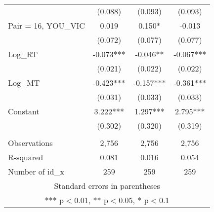 \documentclass[]{article}
\begin{document}
\begin{tabular}{lccc}
 & (0.088) & (0.093) & (0.093) \\
Pair = 16, YOU\_VIC & 0.019 & 0.150* & -0.013 \\
 & (0.072) & (0.077) & (0.077) \\
Log\_RT & -0.073*** & -0.046** & -0.067*** \\
 & (0.021) & (0.022) & (0.022) \\
Log\_MT & -0.423*** & -0.157*** & -0.361*** \\
 & (0.031) & (0.033) & (0.033) \\
Constant & 3.222*** & 1.297*** & 2.795*** \\
 & (0.302) & (0.320) & (0.319) \\
 &  &  &  \\
Observations & 2,756 & 2,756 & 2,756 \\
R-squared & 0.081 & 0.016 & 0.054 \\
 Number of id\_x & 259 & 259 & 259 \\ \hline
\multicolumn{4}{c}{ Standard errors in parentheses} \\
\multicolumn{4}{c}{ *** p$<$0.01, ** p$<$0.05, * p$<$0.1} \\
\end{tabular}
\end{document}
